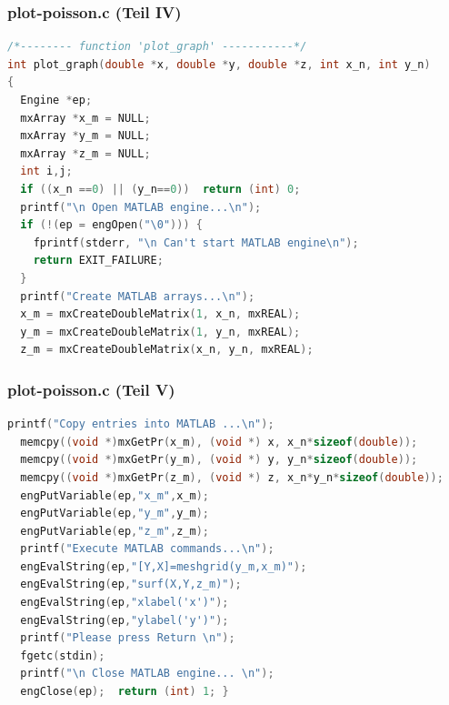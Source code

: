 \documentclass[hyperref={xetex}]{beamer}
\begin{document}
%
%
\begin{frame}[fragile]\frametitle{plot-poisson.c (Teil IV)}
\begin{lstlisting}[language=C++]     
/*-------- function 'plot_graph' -----------*/
int plot_graph(double *x, double *y, double *z, int x_n, int y_n)
{  
  Engine *ep;
  mxArray *x_m = NULL;
  mxArray *y_m = NULL;
  mxArray *z_m = NULL;
  int i,j;
  if ((x_n ==0) || (y_n==0))  return (int) 0;
  printf("\n Open MATLAB engine...\n");
  if (!(ep = engOpen("\0"))) {
    fprintf(stderr, "\n Can't start MATLAB engine\n");
    return EXIT_FAILURE;
  }
  printf("Create MATLAB arrays...\n");
  x_m = mxCreateDoubleMatrix(1, x_n, mxREAL);
  y_m = mxCreateDoubleMatrix(1, y_n, mxREAL);
  z_m = mxCreateDoubleMatrix(x_n, y_n, mxREAL);
\end{lstlisting}
\end{frame}
%
%
\begin{frame}[fragile]\frametitle{plot-poisson.c (Teil V)}
\begin{lstlisting}[language=C++]     
  printf("Copy entries into MATLAB ...\n");
  memcpy((void *)mxGetPr(x_m), (void *) x, x_n*sizeof(double));
  memcpy((void *)mxGetPr(y_m), (void *) y, y_n*sizeof(double));
  memcpy((void *)mxGetPr(z_m), (void *) z, x_n*y_n*sizeof(double));      
  engPutVariable(ep,"x_m",x_m);
  engPutVariable(ep,"y_m",y_m);
  engPutVariable(ep,"z_m",z_m);     
  printf("Execute MATLAB commands...\n");
  engEvalString(ep,"[Y,X]=meshgrid(y_m,x_m)");
  engEvalString(ep,"surf(X,Y,z_m)");
  engEvalString(ep,"xlabel('x')");
  engEvalString(ep,"ylabel('y')"); 
  printf("Please press Return \n");
  fgetc(stdin);  
  printf("\n Close MATLAB engine... \n");
  engClose(ep);  return (int) 1; }  
\end{lstlisting}
\end{frame}
\end{document}

